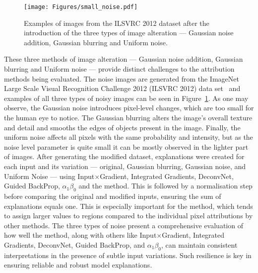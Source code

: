 \begin{figure}[ht!]
	\begin{center}
		\texttt{[image: Figures/small\_noise.pdf]}
	\end{center}
	\caption{Examples of images from the ILSVRC 2012 dataset after the introduction of the three types of image alteration --- Gaussian noise addition, Gaussian blurring and Uniform noise.}
	\label{Fig:noisy_images}
\end{figure} 

These three methods of image alteration --- Gaussian noise addition, Gaussian blurring and Uniform noise --- provide distinct challenges to the attribution methods being evaluated. The noise images are generated from the ImageNet Large Scale Visual Recognition Challenge 2012 (ILSVRC 2012) data set~\cite{ILSVRC15} and examples of all three types of noisy images can be seen in Figure~\ref{Fig:noisy_images}. As one may observe, the Gaussian noise introduces pixel-level changes, which are too small for the human eye to notice. The Gaussian blurring alters the image's overall texture and detail and smooths the edges of objects present in the image. Finally, the uniform noise affects all pixels with the same probability and intensity, but as the noise level parameter is quite small it can be mostly observed in the lighter part of images. After generating the modified dataset, explanations were created for each input and its variation --- original, Gaussian blurring, Gaussian noise, and Uniform Noise --- using Input$\times$Gradient, Integrated Gradients, DeconvNet, Guided BackProp, \LRP\-$\alpha_1\beta_0$ and the \CTC\/ method. This is followed by a normalisation step before comparing the original and modified inputs, ensuring the sum of explanations equals one. This is especially important for the \CTC\/ method, which tends to assign larger values to regions compared to the individual pixel attributions by other methods. The three types of noise present a comprehensive evaluation of how well the \CTC\/ method, along with others like Input$\times$Gradient, Integrated Gradients, DeconvNet, Guided BackProp, and \LRP\-$\alpha_1\beta_0$, can maintain consistent interpretations in the presence of subtle input variations. Such resilience is key in ensuring reliable and robust model explanations.


